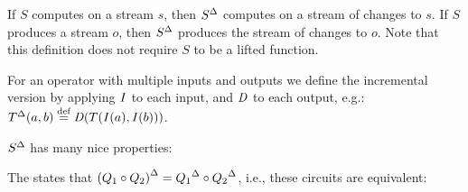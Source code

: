 \vspace{-2ex}
\begin{center}
\end{center}
\vspace{-1ex}

If $S$ computes on a stream $s$, then ${S}^{\Delta}$ computes on a stream
of changes to $s$.  If $S$ produces a stream $o$, then ${S}^{\Delta}$
produces the stream of changes to $o$.  Note that this definition does
not require $S$ to be a lifted function.

For an operator with multiple inputs and outputs we define the
incremental version by applying $\mathit{I}$ to each input, and $\mathit{D}$ to each
output, e.g.: $\inc{T}(a, b) \defn \D (T(\I(a), \I(b)))$.

%
${S}^{\Delta}$ has many nice properties:

%
The  states that ${(Q_1 \circ Q_2)}^{\Delta} =
{Q_1}^{\Delta} \circ {Q_2}^{\Delta}$, i.e., these circuits are equivalent:

